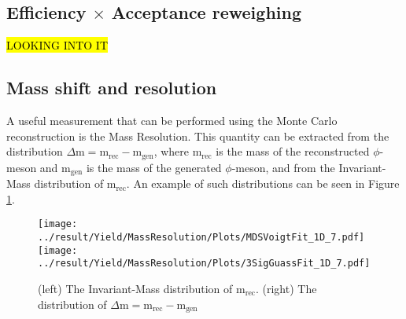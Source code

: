 \subsection{Efficiency $\times$ Acceptance reweighing}
\hl{LOOKING INTO IT}

\subsection{Mass shift and resolution}
A useful measurement that can be performed using the Monte Carlo reconstruction is the Mass Resolution. This quantity can be extracted from the distribution $\Delta\text{m} = \text{m}_{\text{rec}} - \text{m}_{\text{gen}}$, where $\text{m}_{\text{rec}}$ is the mass of the reconstructed $\phi$-meson and $\text{m}_{\text{gen}}$ is the mass of the generated $\phi$-meson, and from the Invariant-Mass distribution of $\text{m}_{\text{rec}}$. An example of such distributions can be seen in Figure \ref{fig:InvMassDist}.

\begin{figure}[!h]
\centering
\texttt{[image: ../result/Yield/MassResolution/Plots/MDSVoigtFit\_1D\_7.pdf]}
\texttt{[image: ../result/Yield/MassResolution/Plots/3SigGuassFit\_1D\_7.pdf]}
\caption{(left) The Invariant-Mass distribution of $\text{m}_{\text{rec}}$. (right) The distribution of $\Delta\text{m} = \text{m}_{\text{rec}} - \text{m}_{\text{gen}}$ }
\label{fig:InvMassDist}
\end{figure}

